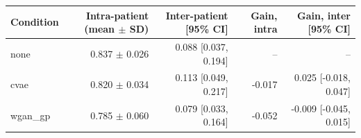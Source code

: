 \begin{tabular}{lrrrr}
\toprule
Condition & Intra-patient (mean $\pm$ SD) & Inter-patient [95\% CI] & Gain, intra & Gain, inter [95\% CI] \\
\midrule
none & 0.837 $\pm$ 0.026 & 0.088 [0.037, 0.194] & -- & -- \\
cvae & 0.820 $\pm$ 0.034 & 0.113 [0.049, 0.217] & -0.017 & 0.025 [-0.018, 0.047] \\
wgan\_gp & 0.785 $\pm$ 0.060 & 0.079 [0.033, 0.164] & -0.052 & -0.009 [-0.045, 0.015] \\
\bottomrule
\end{tabular}
